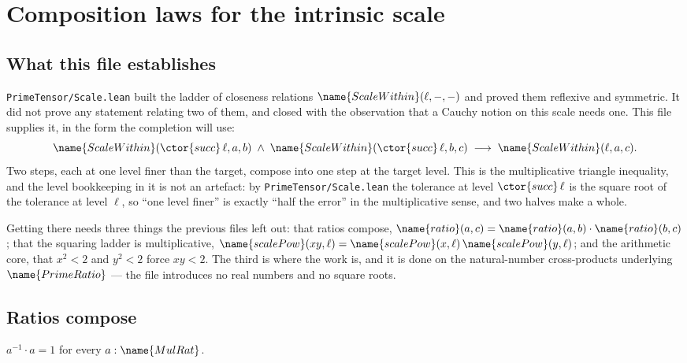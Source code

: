 
\section{Composition laws for the intrinsic scale}
\label{Scale:Laws:sec}


\subsection*{What this file establishes}

\texttt{PrimeTensor/Scale.lean} built the ladder of closeness relations
$\name{ScaleWithin}(\ell,-,-)$ and proved them reflexive and symmetric.  It
did not prove any statement relating two of them, and closed with the
observation that a Cauchy notion on this scale needs one.  This file supplies
it, in the form the completion will use:
\[
  \name{ScaleWithin}(\ctor{succ}\,\ell, a, b)
  \;\wedge\;
  \name{ScaleWithin}(\ctor{succ}\,\ell, b, c)
  \;\longrightarrow\;
  \name{ScaleWithin}(\ell, a, c).
\]
Two steps, each at one level finer than the target, compose into one step at
the target level.  This is the multiplicative triangle inequality, and the
level bookkeeping in it is not an artefact: by
\texttt{PrimeTensor/Scale.lean} the tolerance at level $\ctor{succ}\,\ell$ is
the square root of the tolerance at level $\ell$, so ``one level finer'' is
exactly ``half the error'' in the multiplicative sense, and two halves make a
whole.

Getting there needs three things the previous files left out: that ratios
compose, $\name{ratio}(a,c) = \name{ratio}(a,b)\cdot\name{ratio}(b,c)$; that
the squaring ladder is multiplicative,
$\name{scalePow}(xy,\ell) = \name{scalePow}(x,\ell)\,\name{scalePow}(y,\ell)$;
and the arithmetic core, that $x^2 < 2$ and $y^2 < 2$ force $xy < 2$.  The
third is where the work is, and it is done on the natural-number
cross-products underlying $\name{PrimeRatio}$ --- the file introduces no real
numbers and no square roots.

\subsection{Ratios compose}

\begin{lemma}\label{Scale:Laws:lem:inv-mul}
$a^{-1} \cdot a = 1$ for every $a : \name{MulRat}$.
\end{lemma}


